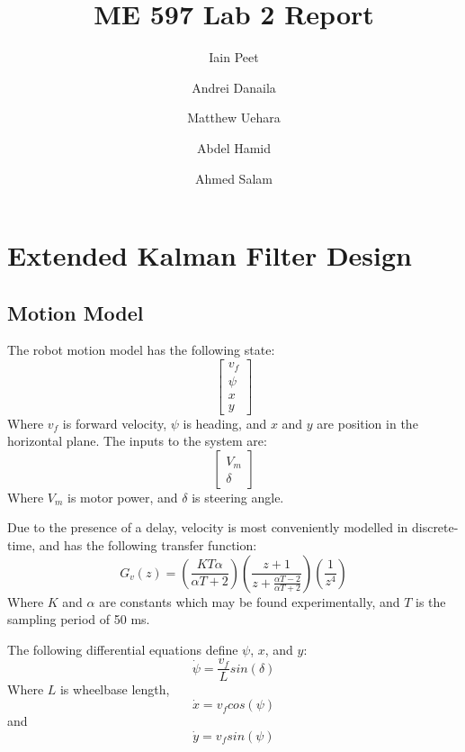 \documentclass[11pt]{article} %
\title{ME 597 Lab 2 Report}
\author{Iain Peet \and Andrei Danaila \and Matthew Uehara \and Abdel Hamid \and Ahmed Salam}
\begin{document}
\maketitle

\clearpage

\section{Extended Kalman Filter Design}

\subsection{Motion Model}
The robot motion model has the following state:
\begin{equation}
\left[ \begin{array}{c}
v_f \\
\psi \\
x \\
y
\end{array} \right] 
\end{equation}
Where $v_f$ is forward velocity, $\psi$ is heading, and $x$ and $y$ are position in the horizontal plane.  The inputs to the system are:
\begin{equation}
\left[ \begin{array}{c}
V_m \\
\delta
\end{array} \right]
\end{equation}
Where $V_m$ is motor power, and $\delta$ is steering angle.

Due to the presence of a delay, velocity is most conveniently modelled in discrete-time, and has the following transfer function:
\begin{equation}
G_v(z) =  (\frac{K T \alpha}{\alpha T + 2}) (\frac{z + 1}{z + \frac{\alpha T - 2}{\alpha T + 2}}) (\frac{1}{z^4})
\label{vf}
\end{equation}
Where $K$ and $\alpha$ are constants which may be found experimentally, and $T$ is the sampling period of 50 ms.

The following differential equations define $\psi$, $x$, and $y$:
\begin{equation}
\dot{\psi} = \frac{v_f}{L} sin(\delta)
\end{equation}
Where $L$ is wheelbase length,
\begin{equation}
\dot{x} = v_f cos( \psi )
\end{equation}
and
\begin{equation}
\dot{y} = v_f sin( \psi )
\label{y}
\end{equation}
\end{document}
